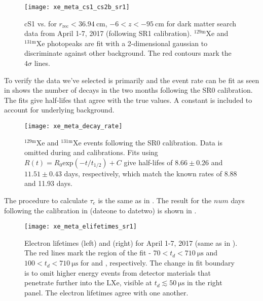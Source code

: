 \begin{figure}
\centering
\texttt{[image: xe\_meta\_cs1\_cs2b\_sr1]}
\caption{cS1 vs. \cstwob for $r_{\mathrm{rec}} < 36.94\ \mathrm{cm}$, $-6 < z < -95\ \mathrm{cm}$ for dark matter search data from April
1-7, 2017 (following SR1 \ambe calibration).  $\mathrm{^{129m}Xe}$ and
$\mathrm{^{131m}Xe}$ photopeaks are fit with a 2-dimensional gaussian to discriminate against other background.  The red contours mark
the $4\sigma$ lines.}
\label{fig:electron_lifetimes_measurement_gammas_cs1_cs2}
\end{figure}

To verify the data we've selected is primarily  and  the event rate can be fit as seen in
 shows the number of decays in the two months following the
SR0 \ambe calibration.  The fits give half-lifes that agree with the true values.  A constant is included to account for underlying
background.

\begin{figure}
\centering
\texttt{[image: xe\_meta\_decay\_rate]}
\caption{$\mathrm{^{129m}Xe}$ and $\mathrm{^{131m}Xe}$ events following the SR0 \ambe calibration.  Data is omitted during \metakr
and  calibrations.  Fits using $R(t) = R_0 \mathrm{exp}(-t/t_{1/2}) + C$ give half-lifes of $8.66 \pm 0.26$ and
$11.51 \pm 0.43$ days, respectively, which match the known rates of 8.88 and 11.93 days.}
\label{fig:electron_lifetimes_measurement_gammas_decay_rate}
\end{figure}

The procedure to calculate $\tau_e$ is the same as in .  The result for the
$num$ days following the \ambe calibration in  (dateone to datetwo)
is shown in .

\begin{figure}
\centering
\texttt{[image: xe\_meta\_elifetimes\_sr1]}
\caption{Electron lifetimes  (left) and  (right) for April 1-7, 2017 (same as in
).  The red lines mark the region of the fit - $70 < t_d < 710\ \mathrm{\mu s}$
and $100 < t_d < 710\ \mathrm{\mu s}$ for  and , respectively.  The change in fit boundary is to omit
higher energy events from detector materials that penetrate further into the LXe, visible at $t_d \lesssim 50\ \mathrm{\mu s}$ in the
right panel.  The electron lifetimes agree with one another.}
\label{fig:electron_lifetimes_measurement_gammas_elifetime}
\end{figure}

